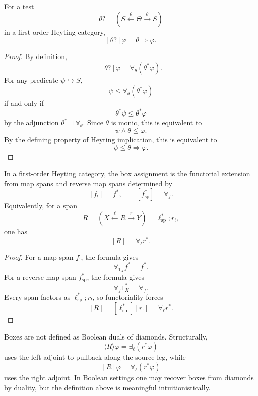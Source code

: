 \begin{proposition}
\label{prop:relative-box-test-law}
For a test
\[
\theta?
=
(S\xleftarrow{\theta}\Theta\xrightarrow{\theta}S)
\]
in a first-order Heyting category,
\[
[\theta?]\varphi
=
\theta\Rightarrow\varphi.
\]
\end{proposition}

\begin{proof}
By definition,
\[
[\theta?]\varphi
=
\forall_\theta(\theta^\ast\varphi).
\]
For any predicate \(\psi\hookrightarrow S\),
\[
\psi\le \forall_\theta(\theta^\ast\varphi)
\]
if and only if
\[
\theta^\ast\psi\le \theta^\ast\varphi
\]
by the adjunction \(\theta^\ast\dashv\forall_\theta\). Since \(\theta\) is
monic, this is equivalent to
\[
\psi\wedge\theta\le\varphi.
\]
By the defining property of Heyting implication, this is equivalent to
\[
\psi\le \theta\Rightarrow\varphi.
\]
\end{proof}

\begin{theorem}
\label{thm:universal-box-relative}
In a first-order Heyting category, the box assignment is the functorial
extension from map spans and reverse map spans determined by
\[
[f_!]=f^\ast,
\qquad
[f^\ast_{\mathrm{sp}}]=\forall_f.
\]
Equivalently, for a span
\[
R=
\left(
X\xleftarrow{\ell}R\xrightarrow{r}Y
\right)
=
\ell^\ast_{\mathrm{sp}};r_!,
\]
one has
\[
[R]=\forall_\ell r^\ast.
\]
\end{theorem}

\begin{proof}
For a map span \(f_!\), the formula gives
\[
\forall_{1_X}f^\ast=f^\ast.
\]
For a reverse map span \(f^\ast_{\mathrm{sp}}\), the formula gives
\[
\forall_f 1_X^\ast=\forall_f.
\]
Every span factors as \(\ell^\ast_{\mathrm{sp}};r_!\), so functoriality forces
\[
[R]
=
[\ell^\ast_{\mathrm{sp}}][r_!]
=
\forall_\ell r^\ast.
\]
\end{proof}

\begin{remark}
\label{rem:box-not-boolean-dual-relative}
Boxes are not defined as Boolean duals of diamonds. Structurally,
\[
\langle R\rangle\varphi=\exists_\ell(r^\ast\varphi)
\]
uses the left adjoint to pullback along the source leg, while
\[
[R]\varphi=\forall_\ell(r^\ast\varphi)
\]
uses the right adjoint. In Boolean settings one may recover boxes from
diamonds by duality, but the definition above is meaningful intuitionistically.
\end{remark}

